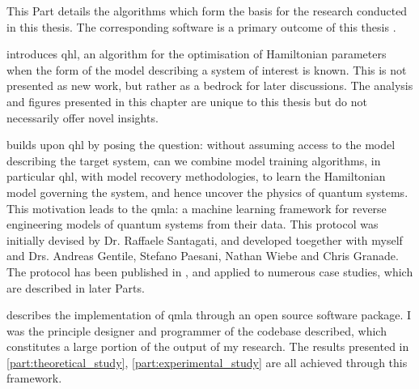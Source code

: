 \glsresetall
This Part details the algorithms which form the basis for the research conducted in this thesis. 
The corresponding software is a primary outcome of this thesis \cite{flynn2021Quantum, flynn2021QMLA, qmla_docs}.

\par 
\vspace{1cm}

 introduces \gls{qhl}, an algorithm for the optimisation of Hamiltonian parameters
    when the form of the model describing a system of interest is known. 
    This is not presented as new work, but rather as a bedrock for later discussions. 
    The analysis and figures presented in this chapter are unique to this thesis but do not necessarily offer novel insights. 
\par 
\vspace{1cm}
 builds upon \gls{qhl} by posing the question: 
    without assuming access to the model describing the target system, can we combine model training algorithms, 
    in particular \gls{qhl}, with model recovery methodologies, to learn the Hamiltonian model 
    governing the system, and hence uncover the physics of quantum systems. 
    This motivation leads to the \acrfull{qmla}: 
    a machine learning framework for reverse engineering models of quantum systems from their data.
    This protocol was initially devised by Dr. Raffaele Santagati, 
    and developed toegether with myself and Drs. Andreas Gentile, Stefano Paesani, Nathan Wiebe and Chris Granade. 
    The protocol has been published in \cite{gentile2020learning}, 
    and applied to numerous case studies, which are described in later Parts. 
\par
\vspace{1cm}

 describes the implementation of \gls{qmla} through an open source software package. 
I was the principle designer and programmer of the codebase described, which constitutes a large portion of the output of my research. 
The results presented in \cref{part:theoretical_study}, \cref{part:experimental_study} are all achieved through this framework. 
